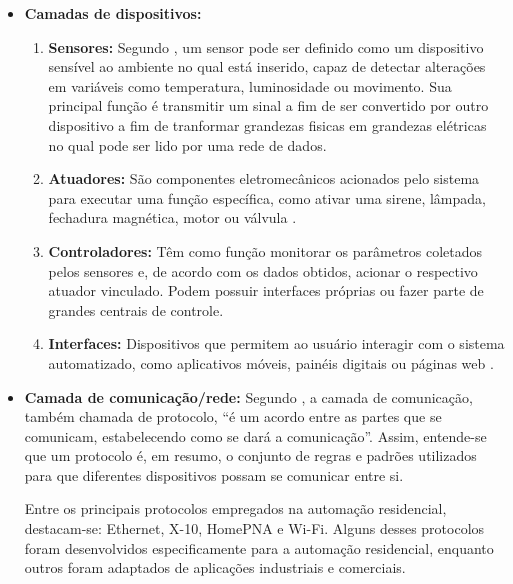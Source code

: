         \begin{itemize}
            \item \textbf{Camadas de dispositivos:} 

            \begin{enumerate}
                \item \textbf{Sensores:} Segundo \cite{leite2020plataforma}, um sensor pode ser definido como um dispositivo sensível ao ambiente no qual está inserido, capaz de detectar alterações em variáveis como temperatura, luminosidade ou movimento. Sua principal função é transmitir um sinal a fim de ser convertido por outro dispositivo a fim de tranformar grandezas fisicas em grandezas elétricas no qual pode ser lido por uma rede de dados.
                
                \item \textbf{Atuadores:} São componentes eletromecânicos acionados pelo sistema para executar uma função específica, como ativar uma sirene, lâmpada, fechadura magnética, motor ou válvula \cite{hipolito2018automaccao}.
                
                \item \textbf{Controladores:} Têm como função monitorar os parâmetros coletados pelos sensores e, de acordo com os dados obtidos, acionar o respectivo atuador vinculado. Podem possuir interfaces próprias ou fazer parte de grandes centrais de controle\cite{hipolito2018automaccao}.
                
                \item \textbf{Interfaces:} Dispositivos que permitem ao usuário interagir com o sistema automatizado, como aplicativos móveis, painéis digitais ou páginas web \cite{accardi2012automaccao}.
            \end{enumerate}
    
            \item \textbf{Camada de comunicação/rede:} 
                Segundo \cite{accardi2012automaccao}, a camada de comunicação, também chamada de protocolo, “é um acordo entre as partes que se comunicam, estabelecendo como se dará a comunicação”. Assim, entende-se que um protocolo é, em resumo, o conjunto de regras e padrões utilizados para que diferentes dispositivos possam se comunicar entre si.
            
                Entre os principais protocolos empregados na automação residencial, destacam-se: Ethernet, X-10, HomePNA e Wi-Fi. Alguns desses protocolos foram desenvolvidos especificamente para a automação residencial, enquanto outros foram adaptados de aplicações industriais e comerciais.
            

\end{itemize}
